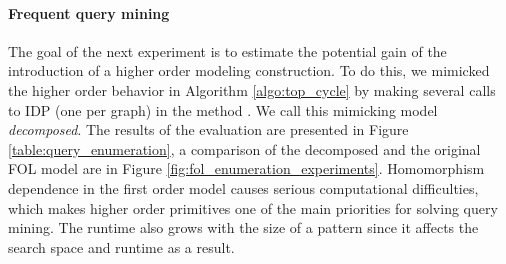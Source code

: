 \paragraph{Frequent query mining}
The goal of the next experiment is to estimate the potential gain of the introduction of a higher order modeling construction. To do this, we mimicked the higher order behavior in Algorithm \ref{algo:top_cycle} by making several calls to IDP (one per graph) in the method \getquery. We call this mimicking model \textit{decomposed}. The results of the evaluation are presented in Figure \ref{table:query_enumeration}, a comparison of the decomposed and the original FOL model are in Figure \ref{fig:fol_enumeration_experiments}. Homomorphism dependence in the first order model causes serious computational difficulties, which makes higher order primitives one of the main priorities for solving query mining. The runtime also grows with the size of a pattern since it affects the search space and runtime as a result. %
